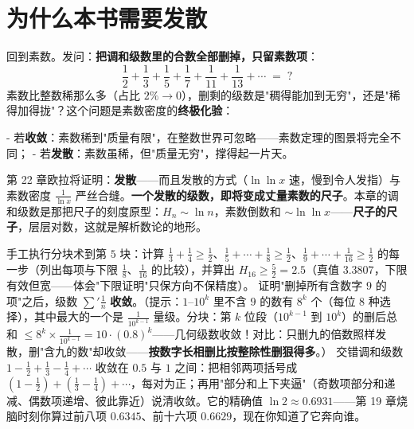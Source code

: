 \section{为什么本书需要发散}

回到素数。发问：\textbf{把调和级数里的合数全部删掉，只留素数项}：
\[
\frac12 + \frac13 + \frac15 + \frac17 + \frac1{11} + \frac1{13} + \cdots \;=\; ?
\]
素数比整数稀那么多（占比 $2\%\to0$），删剩的级数是"稠得能加到无穷"，还是"稀得加得拢"？这个问题是素数密度的\textbf{终极化验}：

- 若\textbf{收敛}：素数稀到"质量有限"，在整数世界可忽略——素数定理的图景将完全不同；
- 若\textbf{发散}：素数虽稀，但"质量无穷"，撑得起一片天。

第 22 章欧拉将证明：\textbf{发散}——而且发散的方式（$\ln\ln x$ 速，慢到令人发指）与素数密度 $\tfrac1{\ln x}$ 严丝合缝。\textbf{一个发散的级数，即将变成丈量素数的尺子}。本章的调和级数是那把尺子的刻度原型：$H_n \sim \ln n$，素数倒数和 $\sim \ln\ln x$——\textbf{尺子的尺子}，层层对数，这就是解析数论的地形。

\begin{dongshou}
\begin{itemize}
  \yisi 手工执行分块术到第 $5$ 块：计算 $\tfrac13+\tfrac14 \ge \tfrac12$、$\tfrac15+\cdots+\tfrac18 \ge \tfrac12$、$\tfrac19+\cdots+\tfrac1{16} \ge \tfrac12$ 的每一步（列出每项与下限 $\tfrac1{8}$、$\tfrac1{16}$ 的比较），并算出 $H_{16} \ge \tfrac52 = 2.5$（真值 $3.3807$，下限有效但宽——体会"下限证明"只保方向不保精度）。
  \yier 证明"删掉所有含数字 $9$ 的项"之后，级数 $\sum'\tfrac1n$ \textbf{收敛}。（提示：$1$--$10^k$ 里不含 $9$ 的数有 $8^k$ 个（每位 $8$ 种选择），其中最大的一个是 $\tfrac{1}{10^{k-1}}$ 量级。分块：第 $k$ 位段（$10^{k-1}$ 到 $10^k$）的删后总和 $\le 8^k\times\tfrac1{10^{k-1}} = 10\cdot(0.8)^k$——几何级数收敛！对比：只删九的倍数照样发散，删"含九的数"却收敛——\textbf{按数字长相删比按整除性删狠得多}。）
  \yier 交错调和级数 $1 - \tfrac12 + \tfrac13 - \tfrac14 + \cdots$ 收敛在 $0.5$ 与 $1$ 之间：把相邻两项括号成 $(1-\tfrac12) + (\tfrac13-\tfrac14)+\cdots$，每对为正；再用"部分和上下夹逼"（奇数项部分和递减、偶数项递增、彼此靠近）说清收敛。它的精确值 $\ln 2 \approx 0.6931$——第 19 章烧脑时刻你算过前八项 $0.6345$、前十六项 $0.6629$，现在你知道了它奔向谁。
\end{itemize}
\end{dongshou}

